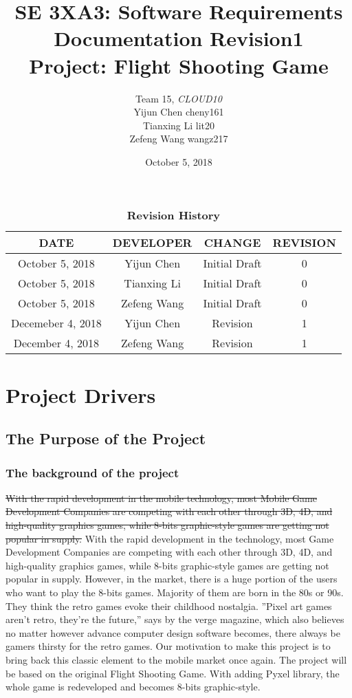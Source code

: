 \documentclass[12pt, titlepage]{article}
\title{SE 3XA3: Software Requirements Documentation Revision1\\Project: Flight Shooting Game}
\author{Team 15, \emph{CLOUD10}
		\\ Yijun Chen cheny161
		\\ Tianxing Li lit20
		\\ Zefeng Wang wangz217
}
\date{October 5, 2018}
\begin{document}
\maketitle

\tableofcontents
\listoftables
\listoffigures

\begin{table}[bp]
\caption{\bf Revision History}
\begin{tabular}{|c|c|c|c|}
    \hline
    \textbf{DATE}&\textbf{DEVELOPER}&\textbf{CHANGE}&\textbf{REVISION} \\
    \hline
    October 5, 2018&Yijun Chen&Initial Draft&0\\
    \hline
     October 5, 2018&Tianxing Li&Initial Draft&0\\
    \hline
     October 5, 2018&Zefeng Wang&Initial Draft&0\\
    \hline
     Decemeber 4, 2018&Yijun Chen&Revision &1\\
    \hline
    December 4, 2018&Zefeng Wang & Revision &1\\
    \hline
\end{tabular}
\end{table}

\newpage


\section{Project Drivers}

\subsection{The Purpose of the Project}
\subsubsection{The background of the project}
\sout{With the rapid development in the mobile technology, most Mobile Game Development Companies are competing with each other through 3D, 4D, and high-quality graphics games, while 8-bits graphic-style games are getting not popular in supply.}{\color{red} With the rapid development in the technology, most Game Development Companies are competing with each other through 3D, 4D, and high-quality graphics games, while 8-bits graphic-style games are getting not popular in supply.} However, in the market, there is a huge portion of the users who want to play the 8-bits games. Majority of them are born in the 80s or 90s. They think the retro games evoke their childhood nostalgia.\cite{b2} ”Pixel art games aren't retro, they're the future\cite{b1},” says by the verge magazine, which also believes no matter however advance computer design software becomes, there always be gamers thirsty for the retro games. Our motivation to make this project is to bring back this classic element to the mobile market once again. The project will be based on the original Flight Shooting Game. With adding Pyxel library, the whole game is redeveloped and becomes 8-bits graphic-style.
\end{document}
